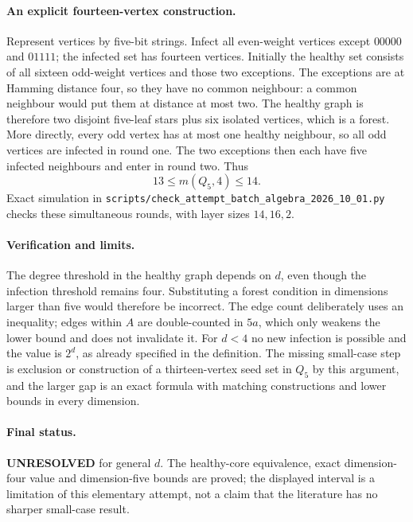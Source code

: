 \documentclass[11pt,a4paper]{article}
\begin{document}
\paragraph{An explicit fourteen-vertex construction.}
Represent vertices by five-bit strings. Infect all even-weight vertices
except $00000$ and $01111$; the infected set has fourteen vertices.
Initially the healthy set consists of all sixteen odd-weight vertices
and those two exceptions. The exceptions are at Hamming distance four,
so they have no common neighbour: a common neighbour would put them
at distance at most two. The healthy graph is therefore two disjoint
five-leaf stars plus six isolated vertices, which is a forest.
More directly, every odd vertex has at most one healthy neighbour,
so all odd vertices are infected in round one. The two exceptions
then each have five infected neighbours and enter in round two.
Thus
\[
 13\le m(Q_5,4)\le14.
\]
Exact simulation in
\texttt{scripts/check\_attempt\_batch\_algebra\_2026\_10\_01.py}
checks these simultaneous rounds, with layer sizes $14,16,2$.

\paragraph{Verification and limits.}
The degree threshold in the healthy graph depends on $d$, even though
the infection threshold remains four. Substituting a forest condition
in dimensions larger than five would therefore be incorrect. The
edge count deliberately uses an inequality; edges within $A$ are
double-counted in $5a$, which only weakens the lower bound and does
not invalidate it. For $d<4$ no new infection is possible and the
value is $2^d$, as already specified in the definition. The missing
small-case step is exclusion or construction of a thirteen-vertex
seed set in $Q_5$ by this argument, and the larger gap is an exact
formula with matching constructions and lower bounds in every dimension.

\paragraph{Final status.}
\textbf{UNRESOLVED} for general $d$. The healthy-core equivalence,
exact dimension-four value and dimension-five bounds are proved;
the displayed interval is a limitation of this elementary attempt,
not a claim that the literature has no sharper small-case result.
\end{document}
